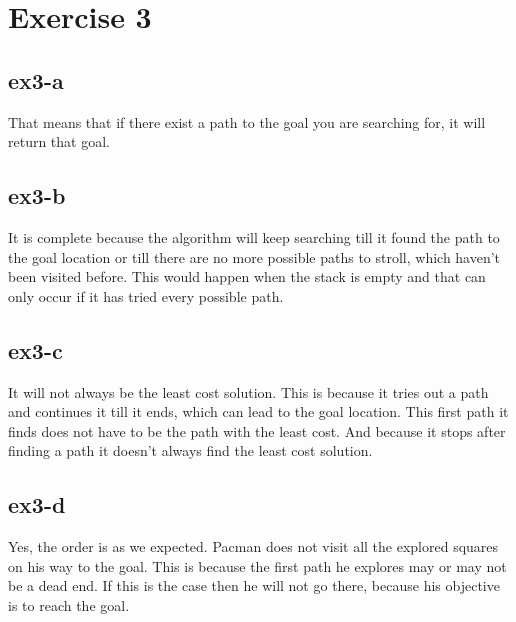 \section{Exercise 3}
\subsection{ex3-a}
That means that if there exist a path to the goal you are searching for, it will return that goal.

\subsection{ex3-b}
It is complete because the algorithm will keep searching till it found the path to the goal location or till there are no more
possible paths to stroll, which haven't been visited before. This would happen when the stack is empty
and that can only occur if it has tried every possible path.

\subsection{ex3-c}
It will not always be the least cost solution. This is because it tries out a path and continues it till it ends, which can
lead to the goal location. This first path it finds does not have to be the path with the least cost.
And because it stops after finding a path it doesn't always find the least cost solution.

\subsection{ex3-d}
Yes, the order is as we expected. Pacman does not visit all the explored squares on his way to the goal. This is because 
the first path he explores may or may not be a dead end. If this is the case then he will not go there, because his objective 
is to reach the goal.